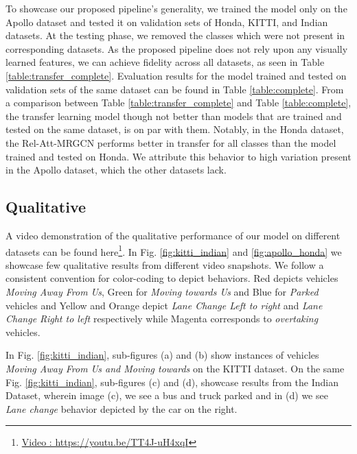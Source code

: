 \documentclass[letterpaper, 10 pt, conference]{ieeeconf}
\begin{document}
To showcase our proposed pipeline's generality, we trained the model only on the Apollo dataset and tested it on validation sets of Honda, KITTI, and Indian datasets. At the testing phase, we removed the classes which were not present in corresponding datasets. As the proposed pipeline does not rely upon any visually learned features, we can achieve fidelity across all datasets, as seen in Table \ref{table:transfer_complete}. Evaluation results for the model trained and tested on validation sets of the same dataset can be found in Table \ref{table:complete}. From a comparison between Table \ref{table:transfer_complete} and Table \ref{table:complete}, the transfer learning model though not better than models that are trained and tested on the same dataset, is on par with them. Notably, in the Honda dataset, the Rel-Att-MRGCN performs better in transfer for all classes than the model trained and tested on Honda. We attribute this behavior to high variation present in the Apollo dataset, which the other datasets lack.
\subsection{Qualitative }
A video demonstration of the qualitative performance of our model on different datasets can be found here\footnote{\href{https://youtu.be/TT4J-uH4xqI}{Video : https://youtu.be/TT4J-uH4xqI}}. In Fig. \ref{fig:kitti_indian} and \ref{fig:apollo_honda} we showcase few qualitative results from different video snapshots. We follow a consistent convention for color-coding to depict behaviors. Red depicts vehicles \textit{Moving Away From Us}, Green for \textit{Moving towards Us} and Blue for \textit{Parked} vehicles and Yellow and Orange depict \textit{Lane Change Left to right} and \textit{Lane Change Right to left} respectively while Magenta corresponds to \textit{overtaking} vehicles.  

In Fig. \ref{fig:kitti_indian}, sub-figures (a) and (b) show instances of vehicles \textit{Moving Away From Us  and Moving towards} on the KITTI dataset. On the same Fig. \ref{fig:kitti_indian}, sub-figures (c) and (d), showcase results from the Indian Dataset, wherein image (c), we see a bus and truck parked and in (d) we see \textit{Lane change} behavior depicted by the car on the right. 
\end{document}
